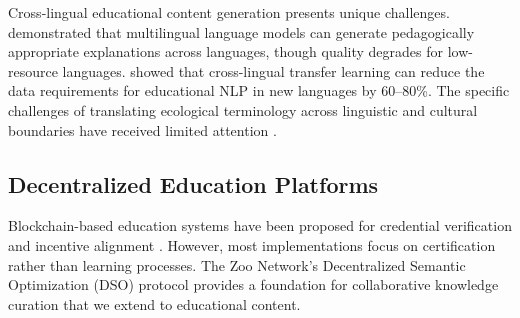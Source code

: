 Cross-lingual educational content generation presents unique challenges.
\citet{fan2021beyond} demonstrated that multilingual language models can generate pedagogically appropriate explanations across languages, though quality degrades for low-resource languages.
\citet{artetxe2020cross} showed that cross-lingual transfer learning can reduce the data requirements for educational NLP in new languages by 60--80\%.
The specific challenges of translating ecological terminology across linguistic and cultural boundaries have received limited attention \citep{maffi2005linguistic}.

\subsection{Decentralized Education Platforms}

Blockchain-based education systems have been proposed for credential verification \citep{grech2017blockchain} and incentive alignment \citep{sharples2016blockchain}.
However, most implementations focus on certification rather than learning processes.
The Zoo Network's Decentralized Semantic Optimization (DSO) protocol \citep{zoo2025dso} provides a foundation for collaborative knowledge curation that we extend to educational content.

